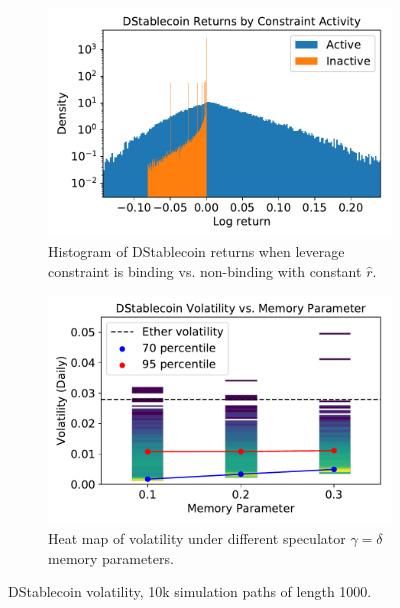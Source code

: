 \begin{figure}
	\centering
	\begin{subfigure}[b]{0.49\textwidth}
		\includegraphics[width=\textwidth]{figures/hist_constraint_returns}
		\caption{Histogram of DStablecoin returns when leverage constraint is binding vs. non-binding with constant $\hat r$.}\label{fig:hist_constraint_returns}
	\end{subfigure}
	\begin{subfigure}[b]{0.49\textwidth}
		\includegraphics[width=\textwidth]{figures/hist_vol_learning_rate}
		\caption{Heat map of volatility under different speculator $\gamma=\delta$ memory parameters.}\label{fig:hist_vol_learning_rate}
	\end{subfigure}
	\caption{DStablecoin volatility, 10k simulation paths of length 1000.}
\end{figure}




